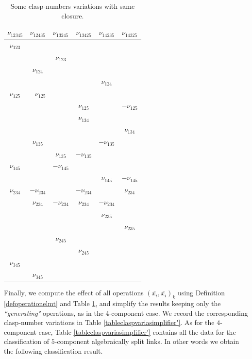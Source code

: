 \documentclass[11pt, a4paper, twoside,reqno]{amsart}
\begin{document}
\begin{table}[!htbp]
\centering

\begin{tabular}{|c|c|c|c|c|c|}

\hline
$\nu_{12345}$&$\nu_{12435}$&$\nu_{13245}$&$\nu_{13425}$&$\nu_{14235}$&$\nu_{14325}$\\
\hline
\hline
$\nu_{123}$&&&&&\\
\hline
&&$\nu_{123}$&&&\\
\hline
&$\nu_{124}$&&&&\\
\hline
&&&&$\nu_{124}$&\\
\hline
$\nu_{125}$&$-\nu_{125}$&&&&\\
\hline
&&&$\nu_{125}$&&$-\nu_{125}$\\
\hline
&&&$\nu_{134}$&&\\
\hline
&&&&&$\nu_{134}$\\
\hline
&$\nu_{135}$&&&$-\nu_{135}$&\\
\hline
&&$\nu_{135}$&$-\nu_{135}$&&\\
\hline
%
%
$\nu_{145}$&&$-\nu_{145}$&&&\\
\hline
&&&&$\nu_{145}$&$-\nu_{145}$\\
\hline
$\nu_{234}$&$-\nu_{234}$&&$-\nu_{234}$&&$\nu_{234}$\\
\hline
&$\nu_{234}$&$-\nu_{234}$&$\nu_{234}$&$-\nu_{234}$&\\
\hline
&&&&$\nu_{235}$&\\
\hline
&&&&&$\nu_{235}$\\
\hline
&&$\nu_{245}$&&&\\
\hline
&&&$\nu_{245}$&&\\
\hline
$\nu_{345}$&&&&&\\
\hline
&$\nu_{345}$&&&&\\
\hline
\end{tabular}
\caption{Some clasp-numbers variations with same closure.}
\label{tablesometransfo'}
\end{table}
Finally, we compute the effect of all operations $(\bar{x_i},\bar{x_i})_k$ using Definition \ref{defoperationelmt} and Table \ref{tablesometransfo'}, and simplify the results keeping only the \emph{“generating"} operations, as in the 4-component case. We record the corresponding clasp-number variations in Table \ref{tableclaspvariasimplifier'}. As for the $4$-component case, Table \ref{tableclaspvariasimplifier'} contains all the data for the classification of $5$-component algebraically split links. In other words we obtain the following classification result. 
\end{document}
